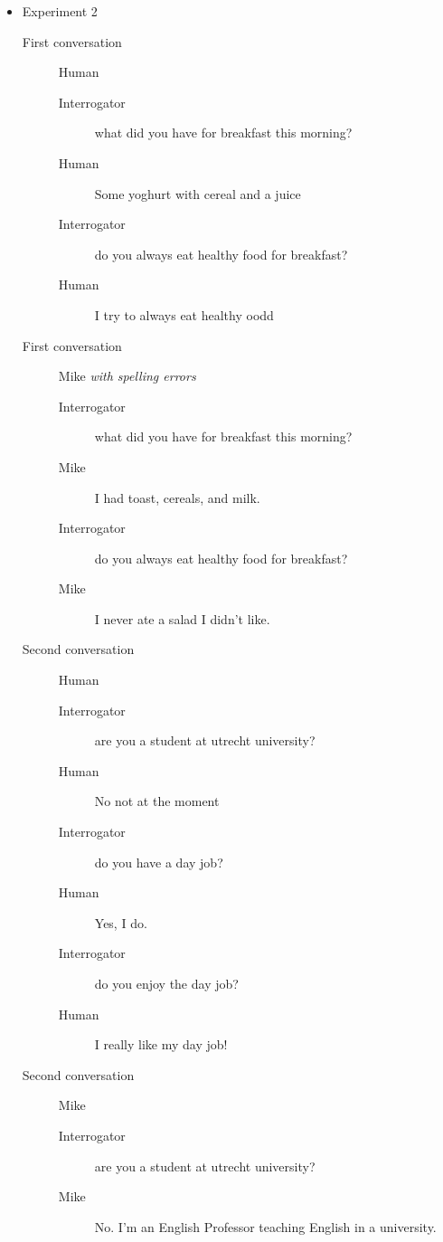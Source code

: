 \begin{itemize}
   \item Experiment 2
      \begin{description}
         \item [First conversation] Human
            \begin{description}
               \item [Interrogator] what did you have for breakfast this morning?
               \item [Human] Some yoghurt with cereal and a juice
               \item [Interrogator] do you always eat healthy food for breakfast?
               \item [Human] I try to always eat healthy oodd
            \end{description}
         \item [First conversation] Mike \textit{with spelling errors}
            \begin{description}
               \item [Interrogator] what did you have for breakfast this morning?
               \item [Mike] I had toast, cereals, and milk.
               \item [Interrogator] do you always eat healthy food for breakfast?
               \item [Mike] I never ate a salad I didn't like.
            \end{description}
         \item [Second conversation] Human
            \begin{description}
               \item [Interrogator] are you a student at utrecht university?
               \item [Human] No not at the moment
               \item [Interrogator] do you have a day job?
               \item [Human] Yes, I do.
               \item [Interrogator] do you enjoy the day job?
               \item [Human] I really like my day job!
            \end{description}
         \item [Second conversation] Mike
            \begin{description}
               \item [Interrogator] are you a student at utrecht university?
               \item [Mike] No. I'm an English Professor teaching English in a university.

\end{description}
\end{description}
\end{itemize}
